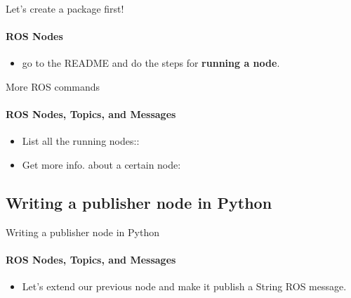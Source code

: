 \documentclass{beamer}
\begin{document}
\begin{frame}{Let's create a package first!}
    \framesubtitle{ROS Nodes}
    
    \begin{itemize}
        \item  go to the README and do the steps for \textbf{running a node}. 
    \end{itemize}   
\end{frame}


\begin{frame}{More ROS commands}
    \framesubtitle{ROS Nodes, Topics, and Messages}
    \begin{itemize}
        \item List all the running nodes::
        
        \begin{terminal}
            \color{green} 
        \end{terminal}
        
        \item Get more info. about a certain node:
        
        \begin{terminal}
            \color{green} 
        \end{terminal}
        
              
        
    \end{itemize}
    
\end{frame}


\subsection{Writing a publisher node in Python}

\begin{frame}[fragile]{Writing a publisher node in Python}
    \framesubtitle{ROS Nodes, Topics, and Messages}
    
    \begin{itemize}
        \item  Let's extend our previous node and make it publish a String ROS message.
    \end{itemize}   
\end{frame}
 
\end{document}
